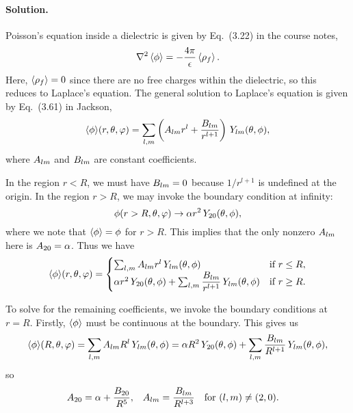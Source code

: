 \documentclass[11pt]{article}
\newcommand{\beq}{\begin{equation*}}
\newcommand{\eeq}{\end{equation*}}
\newcommand{\beqn}{\begin{equation}}
\newcommand{\eeqn}{\end{equation}}
\newenvironment{solution}
{
    \paragraph{Solution.}
    \ignorespaces
}
{
    \bigskip
}
\begin{document}
\begin{solution}
	Poisson's equation inside a dielectric is given by Eq.~(3.22) in the course notes,
	\beq
		\lap\evphi = -\frac{4\pi}{\eps} \evrhof.
	\eeq
	Here, $\evrhof = 0$ since there are no free charges within the dielectric, so this reduces to Laplace's equation.  The general solution to Laplace's equation is given by Eq.~(3.61) in Jackson,
	\beqn \label{lapsol}
		\evphi\!(r, \tht, \vph) = \sum_{l,m} \left( \Alm r^l + \frac{\Blm}{r^{l+1}} \right) \, \Ylm\tv,
	\eeqn
	where $A_{l m}$ and $B_{l m}$ are constant coefficients.
	
	In the region $r < R$, we must have $B_{l m} = 0$ because $1/r^{l+1}$ is undefined at the origin.  In the region $r > R$, we may invoke the boundary condition at infinity:
	\beq
		\phi(r > R, \tht, \vph) \to \alp r^2 \, Y_{2 0}\tv,
	\eeq
	where we note that $\evphi = \phi$ for $r > R$.  This implies that the only nonzero $A_{l m}$ here is $A_{2 0} = \alpha$.  Thus we have
	\beq
		\evphi\!(r, \tht, \vph) = \begin{cases} \sum_{l,m} \Alm r^l \, \Ylm\tv & \tif r \leq R, \\
		\alp r^2 \, Y_{2 0}\tv + \sum_{l,m} \dfrac{\Blm}{r^{l+1}} \, \Ylm\tv & \tif r \geq R. \end{cases}
	\eeq
	
	To solve for the remaining coefficients, we invoke the boundary conditions at $r = R$.  Firstly, $\evphi$ must be continuous at the boundary.  This gives us
	\beq
		\evphi\!(R, \tht, \vph) = \sum_{l,m} \Alm R^l \, \Ylm\tv = \alp R^2 \, Y_{2 0}\tv + \sum_{l,m} \dfrac{\Blm}{R^{l+1}} \, \Ylm\tv,
	\eeq
	so
	\begin{align} \label{c1}
		A_{2 0} &= \alpha + \dfrac{B_{2 0}}{R^{5}}, &
		A_{l m} &= \frac{B_{l m}}{R^{l+3}} \quad \text{for } (l,m) \neq (2,0).
	\end{align}
	

\end{solution}
\end{document}
